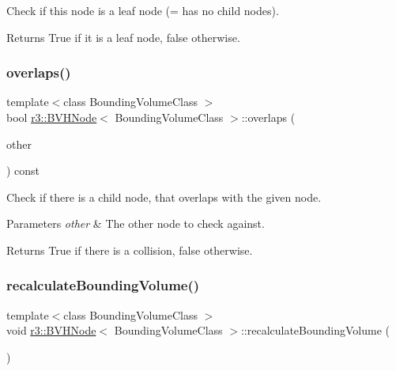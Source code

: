 Check if this node is a leaf node (= has no child nodes). 

\begin{DoxyReturn}{Returns}
True if it is a leaf node, false otherwise. 
\end{DoxyReturn}
\mbox{\label{classr3_1_1_b_v_h_node_a69ec6f958bbe07629cd979599532dfd8}} 
\subsubsection{\texorpdfstring{overlaps()}{overlaps()}}
{\footnotesize\ttfamily template$<$class Bounding\+Volume\+Class $>$ \\
bool \mbox{\hyperlink{classr3_1_1_b_v_h_node}{r3\+::\+B\+V\+H\+Node}}$<$ Bounding\+Volume\+Class $>$\+::overlaps (\begin{DoxyParamCaption}\item[{\mbox{\hyperlink{classr3_1_1_b_v_h_node}{B\+V\+H\+Node}}$<$ Bounding\+Volume\+Class $>$ $\ast$}]{other }\end{DoxyParamCaption}) const\hspace{0.3cm}{\ttfamily [protected]}}



Check if there is a child node, that overlaps with the given node. 


\begin{DoxyParams}{Parameters}
{\em other} & The other node to check against. \\
\hline
\end{DoxyParams}
\begin{DoxyReturn}{Returns}
True if there is a collision, false otherwise. 
\end{DoxyReturn}
\mbox{\label{classr3_1_1_b_v_h_node_a52539a0d78d758021a2fe4bedd30e671}} 
\subsubsection{\texorpdfstring{recalculate\+Bounding\+Volume()}{recalculateBoundingVolume()}}
{\footnotesize\ttfamily template$<$class Bounding\+Volume\+Class $>$ \\
void \mbox{\hyperlink{classr3_1_1_b_v_h_node}{r3\+::\+B\+V\+H\+Node}}$<$ Bounding\+Volume\+Class $>$\+::recalculate\+Bounding\+Volume (\begin{DoxyParamCaption}{ }\end{DoxyParamCaption})\hspace{0.3cm}{\ttfamily [protected]}}



